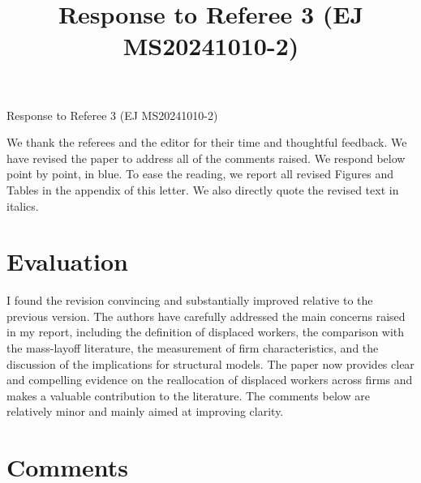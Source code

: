 \documentclass[11pt]{article}
\title{Response to Referee 3 (EJ MS20241010-2)}
\date{}
\newcommand{\comment}[1]{\begingroup #1\endgroup}
\newcommand{\answer}[1]{\begingroup\color{navy}#1\endgroup}
\begin{document}

\begin{center}
   \LARGE{Response to Referee 3 (EJ MS20241010-2)}
\end{center}

\vspace{0.5em}
\noindent \answer{We thank the referees and the editor for their time and thoughtful feedback. We have revised the paper to address all of the comments raised. We respond below point by point, in blue. To ease the reading, we report all revised Figures and Tables in the appendix of this letter. We also directly quote the revised text in italics.}\par

% 

\section*{Evaluation}
\comment{
I found the revision convincing and substantially improved relative to the previous version. The authors have carefully addressed the main concerns raised in my report, including the definition of displaced workers, the comparison with the mass-layoff literature, the measurement of firm characteristics, and the discussion of the implications for structural models. The paper now provides clear and compelling evidence on the reallocation of displaced workers across firms and makes a valuable contribution to the literature. The comments below are relatively minor and mainly aimed at improving clarity.
}\par



\section*{Comments}
\end{document}
